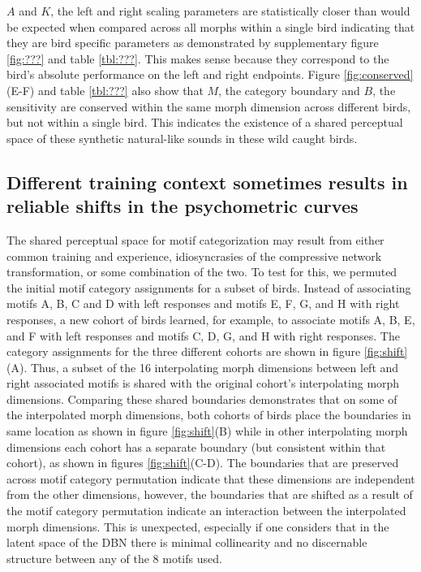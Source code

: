 $A$ and $K$, the left and right scaling parameters are statistically closer than would be expected when compared across all morphs within a single bird indicating that they are bird specific parameters as demonstrated by supplementary figure \ref{fig:???} and table \ref{tbl:???}. This makes sense because they correspond to the bird's absolute performance on the left and right endpoints. Figure \ref{fig:conserved}(E-F) and table \ref{tbl:???} also show that $M$, the category boundary and $B$, the sensitivity are conserved within the same morph dimension across different birds, but not within a single bird. This indicates the existence of a shared perceptual space of these synthetic natural-like sounds in these wild caught birds. 

\subsection{Different training context sometimes results in reliable shifts in the psychometric curves}



The shared perceptual space for motif categorization may result from either common training and experience, idiosyncrasies of the compressive network transformation, or some combination of the two. To test for this, we permuted the initial motif category assignments for a subset of birds. Instead of associating motifs A, B, C and D with left responses and motifs E, F, G, and H with right responses, a new cohort of birds learned, for example, to associate motifs A, B, E, and F with left responses and motifs C, D, G, and H with right responses. The category assignments for the three different cohorts are shown in figure \ref{fig:shift}(A). Thus, a subset of the 16 interpolating morph dimensions between left and right associated motifs is shared with the original cohort's interpolating morph dimensions. Comparing these shared boundaries demonstrates that on some of the interpolated morph dimensions, both cohorts of birds place the boundaries in same location as shown in figure \ref{fig:shift}(B) while in other interpolating morph dimensions each cohort has a separate boundary (but consistent within that cohort), as shown in figures \ref{fig:shift}(C-D). The boundaries that are preserved across motif category permutation indicate that these dimensions are independent from the other dimensions, however, the boundaries that are shifted as a result of the motif category permutation indicate an interaction between the interpolated morph dimensions. This is unexpected, especially if one considers that in the latent space of the DBN there is minimal collinearity and no discernable structure between any of the 8 motifs used.


